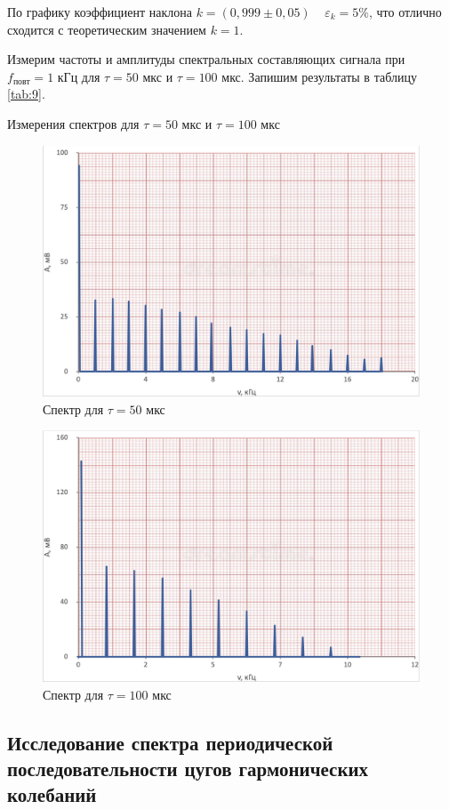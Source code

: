 \documentclass[12pt,a4paper]{article}
\begin{document}
По графику коэффициент наклона $k = (0,999 \pm 0,05) \;\;\;\; \varepsilon_k = 5 \%$, что отлично сходится с теоретическим значением $k=1$.

Измерим частоты и амплитуды спектральных составляющих сигнала при $f_\text{повт} = 1 \text{ кГц}$ для $\tau = 50 \text{ мкс}$ и $\tau = 100 \text{ мкс}$. Запишим результаты в таблицу \ref{tab:9}.

\begin{table}[H]
    \caption{Измерения спектров для $\tau = 50 \text{ мкс}$ и $\tau = 100 \text{ мкс}$}
    
	\label{tab:9}
\end{table}

\begin{figure}[H]
	\centering
	\includegraphics[width = 10 cm]{src/9_50.png}
	\caption{Спектр для $\tau = 50 \text{ мкс}$}
\end{figure}

\begin{figure}[H]
	\centering
	\includegraphics[width = 10 cm]{src/9_100.png}
	\caption{Спектр для $\tau = 100 \text{ мкс}$}
\end{figure}



\subsection*{Исследование спектра периодической последовательности цугов гармонических колебаний}
\end{document}
